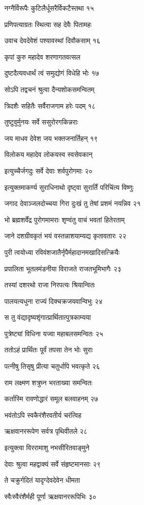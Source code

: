 नग्नैर्विरूपैः कुटिलैर्धूसरैर्विकटैस्तथा १५

प्रणिपत्याग्रतः स्थित्वा सह देवैः पितामहः

उवाच देवदेवेशं पश्यावस्थां दिवौकसाम् १६

कृपां कुरु महादेव शरणागतवत्सल

दुष्टदैत्यवधार्थं त्वं समुद्योगं विधेहि भोः १७

सोऽपि तद्वचनं श्रुत्वा दैन्यशोकसमन्वितम्

त्रिदशैः सहितैः सर्वैराजगाम हरेः पदम् १८

तुष्टुवुर्मुनयः सर्वे ससुरोरगकिन्नराः

जय माधव देवेश जय भक्तजनार्तिहन् १९

विलोकय महादेव लोकयस्व स्वसेवकान्

इत्युच्चैर्जगदुः सर्वे देवाः शर्वपुरोगमाः २०

इत्युक्तमाकर्ण्य सुराधिनाथो दृष्ट्वा सुरार्तिं परिचिंत्य विष्णुः

जगाद देवाञ्जलदोच्चया गिरा दुःखं तु तेषां प्रशमं नयन्निव २१

भो ब्रह्मशर्वेंद्र पुरोगमामराः शृण्वंतु वाचं भवतां हितेरताम्

जाने दशग्रीवकृतं भयं वस्तन्नाशयाम्यद्य कृतावतारः २२

पुरी त्वयोध्या रविवंशजातैर्नृपैर्महादानमखादिसत्क्रियैः

प्रपालिता भूतलमंडनीया विराजते राजतभूमिभागैः २३

तस्यां दशरथो राजा निरपत्यः श्रियान्वितः

पालयत्यधुना राज्यं दिक्चक्रजयवान्विभुः २४

स तु वंद्यादृष्यशृंगात्प्रार्थितात्पुत्रकाम्यया

पुत्रेष्ट्यां विधिना यज्वा महाबलसमन्वितः २५

ततोऽहं प्रार्थितः पूर्वं तपसा तेन भोः सुराः

पत्नीषु तिसृषु प्रीत्या चतुर्धापि भवत्कृते २६

राम लक्ष्मण शत्रुघ्न भरताख्या समन्वितः

कर्तास्मि रावणोद्धारं समूल बलवाहनम् २७

भवंतोऽपि स्वकैरंशैरवतीर्य चरंत्विह

ऋक्षवानररूपेण सर्वत्र पृथिवीतले २८

इत्युक्त्वा विररामाशु नभसीरितवाङ्मुने

देवाः श्रुत्वा महद्वाक्यं सर्वे संहृष्टमानसाः २९

ते चक्रुर्गदितं यादृग्देवदेवेन धीमता

स्वैःस्वैरंशैर्मही पूर्णा ऋक्षवानररूपिभिः ३०

